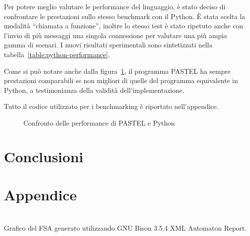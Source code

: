 \documentclass[]{article}
\begin{document}
Per potere meglio valutare le performance del linguaggio, è stato deciso di confrontare le prestazioni sullo stesso benchmark con il Python. È stata scelta la modalità ``chiamata a funzione'', inoltre lo stesso test è stato ripetuto anche con l'invio di più messaggi una singola connessione per valutare una più ampia gamma di scenari. I nuovi risultati sperimentali sono sintetizzati nella tabella~\ref{table:python-performance}.

Come si può notare anche dalla figura~\ref{fig:performance-comparison}, il programma PASTEL ha sempre prestazioni comparabili se non migliori di quelle del programma equivalente in Python, a testimonianza della validità dell'implementazione.

Tutto il codice utilizzato per i benchmarking è riportato nell'appendice.



\begin{figure}
	\centering
	\caption{Confronto delle performance di PASTEL e Python}
	\label{fig:performance-comparison}
\end{figure}


\section{Conclusioni}\label{section:conclusioni}



\clearpage



\clearpage
\section*{Appendice}\label{section:appendix}

\begin{center}
	\centering
	\\
	Grafico del FSA generato utilizzando GNU Bison 3.5.4 XML Automaton Report.
\end{center}



\end{document}
